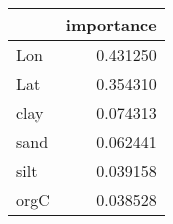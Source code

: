 \begin{tabular}{lr}
\toprule
 & importance \\
\midrule
Lon & 0.431250 \\
Lat & 0.354310 \\
clay & 0.074313 \\
sand & 0.062441 \\
silt & 0.039158 \\
orgC & 0.038528 \\
\bottomrule
\end{tabular}
